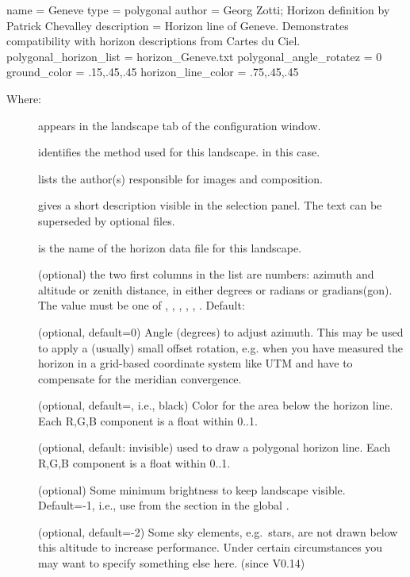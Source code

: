 \begin{configfile}
[landscape]
name = Geneve
type = polygonal
author = Georg Zotti; Horizon definition by Patrick Chevalley
description = Horizon line of Geneve. 
              Demonstrates compatibility with 
              horizon descriptions from Cartes du Ciel.
polygonal_horizon_list = horizon_Geneve.txt
polygonal_angle_rotatez = 0
ground_color = .15,.45,.45
horizon_line_color = .75,.45,.45
\end{configfile}
%
Where:
\begin{description}
\item[] appears in the landscape tab of the configuration window.
\item[] identifies the method used for this landscape.  in this case.
\item[] lists the author(s) responsible for images and composition.
\item[] gives a short description visible in the
  selection panel. The text can be superseded by optional
   files.
\item[] is the name of the horizon data file for this landscape.
\item[] (optional) the two first
  columns in the list are numbers: azimuth and altitude or zenith
  distance, in either degrees or radians or gradians(gon). The value
  must be one of , , ,
    , , . Default:
\item[] (optional, default=0) Angle
  (degrees) to adjust azimuth. This may be used to apply a (usually)
  small offset rotation, e.g. when you have measured the horizon in a
  grid-based coordinate system like UTM and have to compensate for the
  meridian convergence.
\item[] (optional, default=, i.e.,
  black) Color for the area below the horizon line. Each R,G,B
  component is a float within 0..1.
\item[] (optional, default: invisible) used
  to draw a polygonal horizon line. Each R,G,B component is a float
  within 0..1.
\item[] (optional) Some minimum brightness to
  keep landscape visible. Default=-1, i.e., use
   from the \var{[landscape]} section in the
  global .
\item[] (optional, default=-2) Some sky
  elements, e.g.\ stars, are not drawn below this altitude to increase
  performance. Under certain circumstances you may want to specify
  something else here. (since V0.14)
\end{description}


